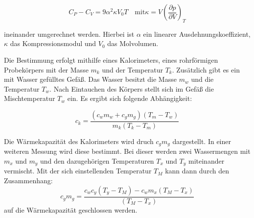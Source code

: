 \begin{equation}
\label{eq:umrechnung_cp_cv}
C_P-C_V=9\alpha^2\kappa V_0 T \quad \text{mit} \kappa=V\left(\frac{\partial p}{\partial V}\right)_T
\end{equation}

ineinander umgerechnet werden.
Hierbei ist $\alpha$ ein linearer Ausdehnungskoeffizient, $\kappa$ das Kompressionsmodul und %
$V_0$ das Molvolumen.

Die Bestimmung erfolgt mithilfe eines Kalorimeters,
eines rohrförmigen Probekörpers mit der Masse $m_k$ und der Temperatur %
$T_k$. Zusätzlich gibt es ein mit Wasser gefülltes Gefäß.
Das Wasser besitzt die Masse $m_w$ und die Temperatur $T_w$.
Nach Eintauchen des Körpers stellt sich im Gefäß die
Mischtemperatur $T_w$ ein.
Es ergibt sich folgende Abhängigkeit:

\begin{equation*}
\label{eq:zusammenhang_ck}
c_k=\frac{\left(c_wm_w+c_gm_g\right)\left(T_m-T_w\right)}{m_k\left(T_k-T_m\right)}
\end{equation*}

Die Wärmekapazität des Kalorimeters wird druch $c_gm_g$ dargestellt. %
In einer weiteren Messung wird diese bestimmt. %
Bei dieser werden zwei Wassermengen mit $m_x$ und $m_y$ und den
dazugehörigen Temperaturen $T_x$ und $T_y$ miteinander vermischt.
Mit der sich einstellenden Temperatur $T_M$ kann dann
durch den Zusammenhang:
\begin{equation}
\label{eq:zusammenhang_cgmg}
c_gm_g=\frac{c_wc_y\left(T_y-T_M\right)-c_wm_x\left(T_M-T_x\right)}{\left(T_M-T_x\right)}
\end{equation}
auf die Wärmekapazität geschlossen werden.

